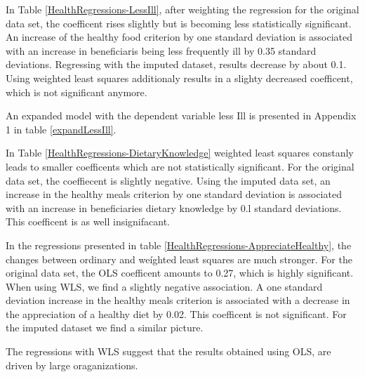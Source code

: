 \documentclass[12pt, a4paper, titlepage]{article}\usepackage[]{graphicx}\usepackage[]{color}
\begin{document}
In Table \ref{HealthRegressions-LessIll}, after weighting the regression for the original data set, the coefficent rises slightly but is becoming less statistically significant. An increase of the healthy food criterion by one standard deviation is associated with an increase in beneficiaris being less frequently ill by 0.35 standard deviations. Regressing with the imputed dataset, results decrease by about 0.1. Using weighted least squares additionaly results in a slighty decreased coefficent, which is not significant anymore. 

An expanded model with the dependent variable less Ill is presented in Appendix 1 in table \ref{expandLessIll}. 

In Table \ref{HealthRegressions-DietaryKnowledge} weighted least squares constanly leads to smaller coefficents which are not statistically significant. For the original data set, the coeffiecent is slightly negative. Using the imputed data set, an increase in the healthy meals criterion by one standard deviation is associated with an increase in beneficiaries dietary knowledge by 0.l standard deviations. This coefficent is as well insignifacant. 

In the regressions presented in table \ref{HealthRegressions-AppreciateHealthy}, the changes between ordinary and weíghted least squares are much stronger. For the original data set, the OLS coefficent amounts to 0.27, which is highly significant. When using WLS, we find a slightly negative association. A one standard deviation increase in the healthy meals criterion is associated with a decrease in the appreciation of a healthy diet by 0.02. This coefficent is not significant. For the imputed dataset we find a similar picture. 

The regressions with WLS suggest that the results obtained using OLS, are driven by large oraganizations.
\end{document}
